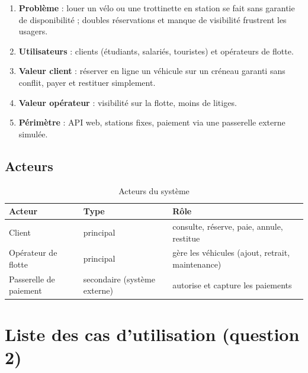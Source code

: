 \documentclass[11pt,a4paper]{article}
\begin{document}
\begin{enumerate}
  \item \textbf{Problème} : louer un vélo ou une trottinette en station se fait
        sans garantie de disponibilité ; doubles réservations et manque de
        visibilité frustrent les usagers.
  \item \textbf{Utilisateurs} : clients (étudiants, salariés, touristes) et
        opérateurs de flotte.
  \item \textbf{Valeur client} : réserver en ligne un véhicule sur un créneau
        garanti sans conflit, payer et restituer simplement.
  \item \textbf{Valeur opérateur} : visibilité sur la flotte, moins de litiges.
  \item \textbf{Périmètre} : API web, stations fixes, paiement via une passerelle
        externe simulée.
\end{enumerate}

\subsection{Acteurs}

\begin{table}[H]
\centering
\begin{tabularx}{\textwidth}{l l L}
\toprule
\textbf{Acteur} & \textbf{Type} & \textbf{Rôle} \\
\midrule
Client & principal & consulte, réserve, paie, annule, restitue \\
Opérateur de flotte & principal & gère les véhicules (ajout, retrait, maintenance) \\
Passerelle de paiement & secondaire (système externe) & autorise et capture les paiements \\
\bottomrule
\end{tabularx}
\caption{Acteurs du système}
\end{table}

\section{Liste des cas d'utilisation (question 2)}
\end{document}
